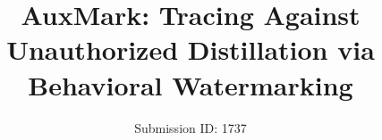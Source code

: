\documentclass[conference,compsoc]{IEEEtran}
\author{
   {\rm Submission ID: 1737}
}
\title{AuxMark: Tracing Against Unauthorized Distillation via Behavioral Watermarking}
\begin{document}
\maketitle

\begin{abstract}

\end{abstract}














\appendices

\end{document}
